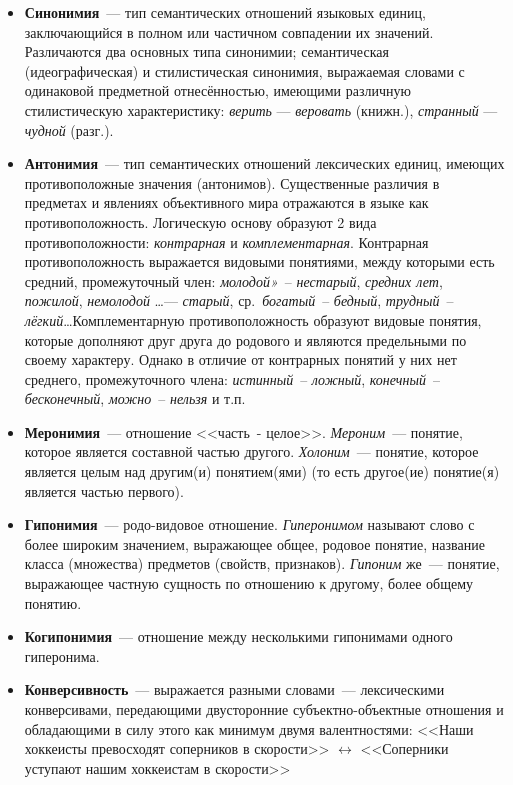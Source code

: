 \documentclass[12pt]{article}
\theoremstyle{definition}
\theoremstyle{remark}
\numberwithin{equation}{section}
\begin{document}
\begin{itemize}
	\item \textbf{Синонимия}~--- тип семантических отношений языковых единиц, заключающийся в полном или частичном совпадении их значений. Различаются два основных типа синонимии; семантическая (идеографическая) и стилистическая синонимия, выражаемая словами с одинаковой предметной отнесённостью, имеющими различную стилистическую характеристику: \textit{верить} — \textit{веровать} (книжн.), \textit{странный} — \textit{чудной} (разг.).
	\item \textbf{Антонимия}~--- тип семантических отношений лексических единиц, имеющих противоположные значения (антонимов). Существенные различия в предметах и явлениях объективного мира отражаются в языке как противоположность. Логическую основу образуют 2 вида противоположности: \textit{контрарная} и \textit{комплементарная}. Контрарная противоположность выражается видовыми понятиями, между которыми есть средний, промежуточный член: \textit{молодой»}~-- \textit{нестарый}, \textit{средних лет}, \textit{пожилой}, \textit{немолодой} \dots — \textit{старый}, ср.~\textit{богатый}~-- \textit{бедный}, \textit{трудный}~-- \textit{лёгкий}\dots Комплементарную противоположность образуют видовые понятия, которые дополняют друг друга до родового и являются предельными по своему характеру. Однако в отличие от контрарных понятий у них нет среднего, промежуточного члена: \textit{истинный}~-- \textit{ложный}, \textit{конечный}~-- \textit{бесконечный}, \textit{можно}~-- \textit{нельзя} и т.п.
	\item \textbf{Меронимия}~--- отношение <<часть~- целое>>. \textit{Мероним}~--- понятие, которое является составной частью другого. \textit{Холоним}~--- понятие, которое является целым над другим(и) понятием(ями) (то есть другое(ие) понятие(я) является частью первого).
	\item \textbf{Гипонимия}~--- родо-видовое отношение. \textit{Гиперонимом} называют слово с более широким значением, выражающее общее, родовое понятие, название класса (множества) предметов (свойств, признаков). \textit{Гипоним} же~--- понятие, выражающее частную сущность по отношению к другому, более общему понятию.
	\item \textbf{Когипонимия}~--- отношение между несколькими гипонимами одного гиперонима.
	\item \textbf{Конверсивность}~--- выражается разными словами~--- лексическими конверсивами, передающими двусторонние субъектно-объектные отношения и обладающими в силу этого как минимум двумя валентностями: <<Наши хоккеисты превосходят соперников в скорости>> $\leftrightarrow$ <<Соперники уступают нашим хоккеистам в скорости>>
\end{itemize}
\end{document}
